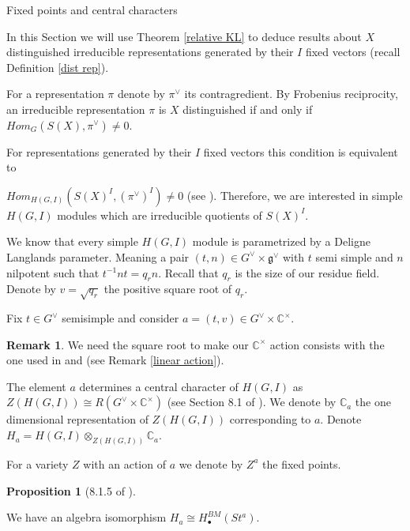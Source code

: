 \documentclass[12pt]{article}
\newcommand{\C}{\mathbb{C}}
\newcommand{\<}{\langle}
\renewcommand{\>}{\rangle}
\theoremstyle{plain}
\theoremstyle{definition}
\newtheorem{prop}[theorem]{Proposition}
\newtheorem{Remark}[theorem]{Remark}
\begin{document}
\begin{section}{Fixed points and central characters}\label{s8}

In this Section we will use Theorem \ref{relative KL} to deduce results about $X$ distinguished irreducible representations generated by their $I$ fixed vectors (recall Definition \ref{dist rep}).

For a representation $\pi$ denote by $\pi^\vee$ its contragredient.
 By Frobenius reciprocity, an irreducible representation $\pi$ is $X$ distinguished if and only if $Hom_G(S(X),\pi^\vee)\neq 0$.  
 
 For representations generated by their $I$ fixed vectors this condition is equivalent to 
 
 $Hom_{H(G,I)}(S(X)^I,(\pi^\vee)^I)\neq 0$ (see \cite{Borel1976}). Therefore, we are interested in simple $H(G,I)$ modules which are irreducible quotients of $S(X)^I$.

We know that every simple $H(G,I)$ module is parametrized by a Deligne Langlands parameter. Meaning a pair $(t,n)\in G^\vee\times \mathfrak{g^\vee}$ with $t$ semi simple and $n$ nilpotent such that $t^{-1}nt=q_rn$. Recall that $q_r$ is the size of our residue field. Denote by $v=\sqrt{q_r}$ the positive square root of $q_r$.

Fix $t\in G^\vee$ semisimple and consider $a=(t,v)\in G^\vee\times\C^\times$. 

\begin{Remark}
    We need the square root to make our $\C^\times$ action consists with the one used in \cite{Chriss1997RepresentationTA} and \cite{Kazhdan1987ProofOT} (see Remark \ref{linear action}).
\end{Remark}

The element $a$ determines a central character of $H(G,I)$ as $Z(H(G,I))\cong R(G^\vee\times\C^\times)$ (see Section 8.1 of \cite{Chriss1997RepresentationTA}). We denote by $\C_a$ the one dimensional representation of $Z(H(G,I))$ corresponding to $a$. Denote $H_a=H(G,I)\otimes_{Z(H(G,I))}\C_a$.

For a variety $Z$ with an action of $a$ we denote by $Z^a$ the fixed points.

\begin{prop}[8.1.5 of \cite{Chriss1997RepresentationTA}]\label{fixed points algebra}

We have an algebra isomorphism $H_a\cong H^{BM}_\bullet(St^a)$.
    
\end{prop}


\end{section}
\end{document}
